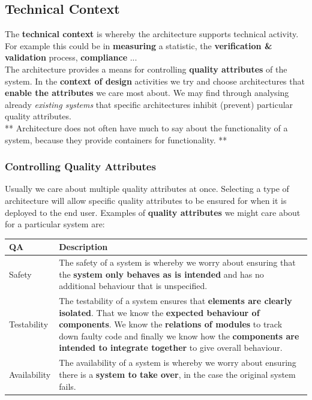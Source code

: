 \documentclass[a4paper]{article}
\begin{document}
\subsection{Technical Context}
The \textbf{technical context} is whereby the architecture supports technical activity. For example this could be in \textbf{measuring} a statistic, the \textbf{verification \& validation} process, \textbf{compliance} ...\\

The architecture provides a means for controlling \textbf{quality attributes} of the system. In the \textbf{context of design} activities we try and choose architectures that \textbf{enable the attributes} we care most about. We may find through analysing already \textit{existing systems} that specific architectures inhibit (prevent) particular quality attributes.\\

** Architecture does not often have much to say about the functionality of a system, because they provide containers for functionality. **

\subsubsection{Controlling Quality Attributes}

Usually we care about multiple quality attributes at once. Selecting a type of architecture will allow specific quality attributes to be ensured for when it is deployed to the end user. Examples of \textbf{quality attributes} we might care about for a particular system are:

\begin{table}[H]
\begin{tabular}{|l|p{10cm}|}
\hline
QA & Description\\
\hline
Safety & The safety of a system is whereby we worry about ensuring that the \textbf{system only behaves as is intended} and has no additional behaviour that is unspecified.\\
\hline
Testability & The testability of a system ensures that \textbf{elements are clearly isolated}. That we know the \textbf{expected behaviour of components}. We know the \textbf{relations of modules} to track down faulty code and finally we know how the \textbf{components are intended to integrate together} to give overall behaviour.\\
\hline
Availability & The availability of a system is whereby we worry about ensuring there is a \textbf{system to take over}, in the case the original system fails. \\
\hline
\end{tabular}
\end{table}
\end{document}
